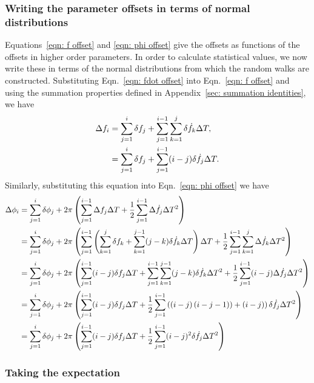 \subsubsection{Writing the parameter offsets in terms of normal distributions}
Equations~\eqref{eqn: f offset} and \eqref{eqn: phi
offset} give the offsets as functions of the offsets in higher order
parameters. In order to calculate statistical values, we now write these in terms of
the normal distributions from which the random walks are constructed.
Substituting Eqn.~\eqref{eqn: fdot
offset} into Eqn.~\eqref{eqn: f offset} and using the summation properties defined
in Appendix~\ref{sec: summation identities}, we have
\begin{align}
\Delta f_{i}  & = \sum_{j=1}^{i}\delta f_{j}
+ \sum_{j=1}^{i-1}\sum_{k=1}^{j}\delta \dot{f}_{k} \Delta T ,  \\
& = \sum_{j=1}^{i}\delta f_{j}
+ \sum_{j=1}^{i-1}(i-j)\delta \dot{f}_{j} \Delta T .
\label{eqn: delta f n}
\end{align}
Similarly, substituting this equation into Eqn.~\eqref{eqn: phi offset} we
have
\begin{align}
\begin{split}
\Delta\phi_{i} & = \sum_{j=1}^{i}\delta \phi_{j}
+ 2\pi \left(\sum_{j=1}^{i-1}\Delta f_{j}\Delta T
+ \frac{1}{2}\sum_{j=1}^{i-1}\Delta\dot{f}_{j}\Delta T^{2}\right) \\
& = \sum_{j=1}^{i}\delta \phi_{j} + 2\pi\left(\sum_{j=1}^{i-1}\left(\sum_{k=1}^{j}\delta f_{k}
+ \sum_{k=1}^{j-1}(j-k)\delta\dot{f}_{k}\Delta T\right)\Delta T
 + \frac{1}{2}\sum_{j=1}^{i-1}\sum_{k=1}^{j}\Delta\dot{f}_{k}\Delta T^{2} \right)  \\
& = \sum_{j=1}^{i}\delta \phi_{j} + 2\pi\left(\sum_{j=1}^{i-1}(i-j)\delta f_{j}\Delta T
 + \sum_{j=1}^{i-1}\sum_{k=1}^{j-1}(j-k)\delta\dot{f}_{k}\Delta T^{2}
 + \frac{1}{2}\sum_{j=1}^{i-1}(i-j)\Delta\dot{f}_{j}\Delta T^{2} \right)  \\
& = \sum_{j=1}^{i}\delta \phi_{j} + 2\pi\left(\sum_{j=1}^{i-1}(i-j)\delta f_{j}\Delta T
 + \frac{1}{2}\sum_{j=1}^{i-1}\left(\left(i-j\right)\left(i-j-1)\right)
 + (i-j)\right)\delta\dot{f}_{j}\Delta T^{2}\right)  \\
& = \sum_{j=1}^{i}\delta \phi_{j} + 2\pi\left(\sum_{j=1}^{i-1}(i-j)\delta f_{j}\Delta T
 + \frac{1}{2}\sum_{j=1}^{i-1}(i-j)^{2}\delta\dot{f}_{j}\Delta T^{2}\right)
\end{split}
\label{eqn: delta phi n}
\end{align}

\subsubsection{Taking the expectation}

